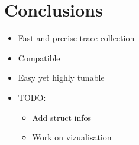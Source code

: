 \section{Conclusions}
\label{sec:cncl}

\begin{itemize}
    \item Fast and precise trace collection
    \item Compatible
    \item Easy yet highly tunable
    \item TODO:
        \begin{itemize}
            \item Add struct infos
            \item Work on vizualisation
        \end{itemize}
\end{itemize}
